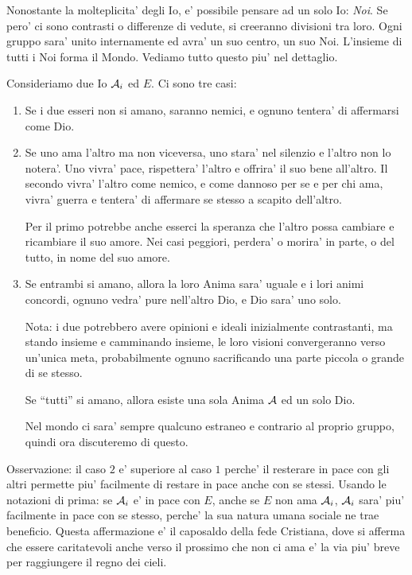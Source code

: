     Nonostante la molteplicita' degli Io, e' possibile pensare ad un solo Io: \emph{Noi}. Se pero' ci sono contrasti o differenze di vedute, si creeranno divisioni tra loro. Ogni gruppo sara' unito internamente ed avra' un suo centro, un suo Noi. L'insieme di tutti i Noi forma il Mondo. Vediamo tutto questo piu' nel dettaglio.

    Consideriamo due Io $\mathcal{A}_i$ ed $E$. Ci sono tre casi:

    \begin{enumerate}

        \item Se i due esseri non si amano, saranno nemici, e ognuno tentera' di affermarsi come Dio.

        \item Se uno ama l'altro ma non viceversa, uno stara' nel silenzio e l'altro non lo notera'. Uno vivra' pace, rispettera' l'altro e offrira' il suo bene all'altro. Il secondo vivra' l'altro come nemico, e come dannoso per se e per chi ama, vivra' guerra e tentera' di affermare se stesso a scapito dell'altro.
            
            Per il primo potrebbe anche esserci la speranza che l'altro possa cambiare e ricambiare il suo amore. Nei casi peggiori, perdera' o morira' in parte, o del tutto, in nome del suo amore.

        \item Se entrambi si amano, allora la loro Anima sara' uguale e i lori animi concordi, ognuno vedra' pure nell'altro Dio, e Dio sara' uno solo.

                Nota: i due potrebbero avere opinioni e ideali inizialmente contrastanti, ma stando insieme e camminando insieme, le loro visioni convergeranno verso un'unica meta, probabilmente ognuno sacrificando una parte piccola o grande di se stesso.

                Se ``tutti'' si amano, allora esiste una sola Anima $\mathcal{A}$ ed un solo Dio.

                Nel mondo ci sara' sempre qualcuno estraneo e contrario al proprio gruppo, quindi ora discuteremo di questo.
    \end{enumerate}

Osservazione: il caso $2$ e' superiore al caso $1$ perche' il resterare in pace con gli altri permette piu' facilmente di restare in pace anche con se stessi. Usando le notazioni di prima: se $\mathcal{A}_i$ e' in pace con $E$, anche se $E$ non ama $\mathcal{A}_i$, $\mathcal{A}_i$ sara' piu' facilmente in pace con se stesso, perche' la sua natura umana sociale ne trae beneficio.
Questa affermazione e' il caposaldo della fede Cristiana, dove si afferma che essere caritatevoli anche verso il prossimo che non ci ama e' la via piu' breve per raggiungere il regno dei cieli.

